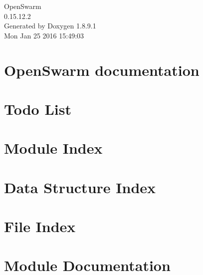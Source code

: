 \documentclass[twoside]{book}
\newcommand{\+}{\discretionary{\mbox{\scriptsize$\hookleftarrow$}}{}{}}
\newcommand{\clearemptydoublepage}{%
  \newpage{\pagestyle{empty}\cleardoublepage}%
}
\begin{document}
\hypersetup{pageanchor=false,
             bookmarks=true,
             bookmarksnumbered=true,
             pdfencoding=unicode
            }
\begin{titlepage}
\vspace*{7cm}
\begin{center}%
{\Large Open\+Swarm \\[1ex]\large 0.\+15.\+12.\+2 }\\
\vspace*{1cm}
{\large Generated by Doxygen 1.8.9.1}\\
\vspace*{0.5cm}
{\small Mon Jan 25 2016 15:49:03}\\
\end{center}
\end{titlepage}
\clearemptydoublepage
\tableofcontents
\clearemptydoublepage
{}
\hypersetup{pageanchor=true}

\chapter{Open\+Swarm documentation}
\label{index}\hypertarget{index}{}
\chapter{Todo List}
\label{dd/da0/todo}
\hypertarget{dd/da0/todo}{}

\chapter{Module Index}

\chapter{Data Structure Index}

\chapter{File Index}

\chapter{Module Documentation}











\end{document}
